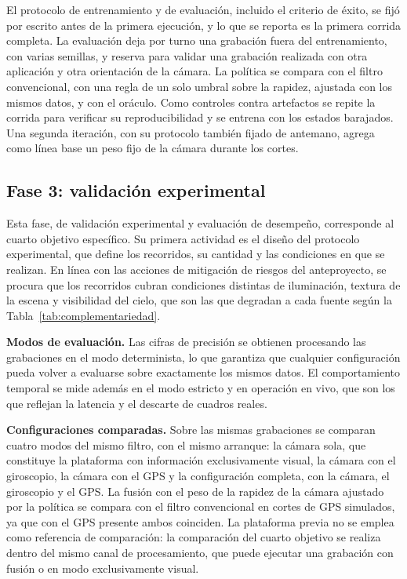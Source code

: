 El protocolo de entrenamiento y de evaluación, incluido el criterio de éxito, se fijó por escrito antes de la primera ejecución, y lo que se reporta es la primera corrida completa.
La evaluación deja por turno una grabación fuera del entrenamiento, con varias semillas, y reserva para validar una grabación realizada con otra aplicación y otra orientación de la cámara.
La política se compara con el filtro convencional, con una regla de un solo umbral sobre la rapidez, ajustada con los mismos datos, y con el oráculo.
Como controles contra artefactos se repite la corrida para verificar su reproducibilidad y se entrena con los estados barajados.
Una segunda iteración, con su protocolo también fijado de antemano, agrega como línea base un peso fijo de la cámara durante los cortes.

\subsection{Fase 3: validación experimental}
\label{sec:met-fase3}

Esta fase, de validación experimental y evaluación de desempeño, corresponde al cuarto objetivo específico.
Su primera actividad es el diseño del protocolo experimental, que define los recorridos, su cantidad y las condiciones en que se realizan.
En línea con las acciones de mitigación de riesgos del anteproyecto, se procura que los recorridos cubran condiciones distintas de iluminación, textura de la escena y visibilidad del cielo, que son las que degradan a cada fuente según la Tabla~\ref{tab:complementariedad}.

\textbf{Modos de evaluación.}
Las cifras de precisión se obtienen procesando las grabaciones en el modo determinista, lo que garantiza que cualquier configuración pueda volver a evaluarse sobre exactamente los mismos datos.
El comportamiento temporal se mide además en el modo estricto y en operación en vivo, que son los que reflejan la latencia y el descarte de cuadros reales.

\textbf{Configuraciones comparadas.}
Sobre las mismas grabaciones se comparan cuatro modos del mismo filtro, con el mismo arranque: la cámara sola, que constituye la plataforma con información exclusivamente visual, la cámara con el giroscopio, la cámara con el GPS y la configuración completa, con la cámara, el giroscopio y el GPS.
La fusión con el peso de la rapidez de la cámara ajustado por la política se compara con el filtro convencional en cortes de GPS simulados, ya que con el GPS presente ambos coinciden.
La plataforma previa no se emplea como referencia de comparación: la comparación del cuarto objetivo se realiza dentro del mismo canal de procesamiento, que puede ejecutar una grabación con fusión o en modo exclusivamente visual.

